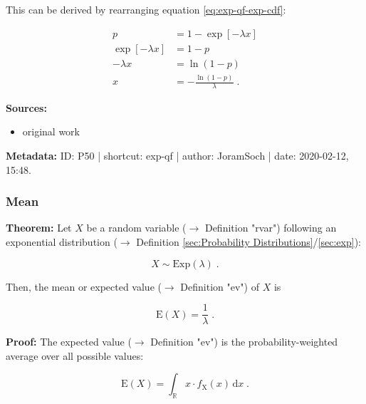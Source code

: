 \documentclass[a4paper,12pt]{book}
\begin{document}
This can be derived by rearranging equation \eqref{eq:exp-qf-exp-cdf}:

\begin{equation} \label{eq:exp-qf-exp-qf-s2}
\begin{split}
p &= 1 - \exp[-\lambda x] \\
\exp[-\lambda x] &= 1-p \\
-\lambda x &= \ln(1-p) \\
x &= -\frac{\ln(1-p)}{\lambda} \; .
\end{split}
\end{equation}

\vspace{1em}
\textbf{Sources:}
\begin{itemize}
\item original work\end{itemize}


\vspace{1em}
\textbf{Metadata:} ID: P50 | shortcut: exp-qf | author: JoramSoch | date: 2020-02-12, 15:48.


\subsubsection[\textbf{Mean}]{Mean} \label{sec:exp-mean}

\vspace{1em}
\textbf{Theorem:} Let $X$ be a random variable ($\rightarrow$ Definition "rvar") following an exponential distribution ($\rightarrow$ Definition \ref{sec:Probability Distributions}/\ref{sec:exp}):

\begin{equation} \label{eq:exp-mean-exp}
X \sim \mathrm{Exp}(\lambda) \; .
\end{equation}

Then, the mean or expected value ($\rightarrow$ Definition "ev") of $X$ is

\begin{equation} \label{eq:exp-mean-exp-mean}
\mathrm{E}(X) = \frac{1}{\lambda} \; .
\end{equation}


\vspace{1em}
\textbf{Proof:} The expected value ($\rightarrow$ Definition "ev") is the probability-weighted average over all possible values:

\begin{equation} \label{eq:exp-mean-mean}
\mathrm{E}(X) = \int_{\mathbb{R}} x \cdot f_\mathrm{X}(x) \, \mathrm{d}x \; .
\end{equation}
\end{document}
